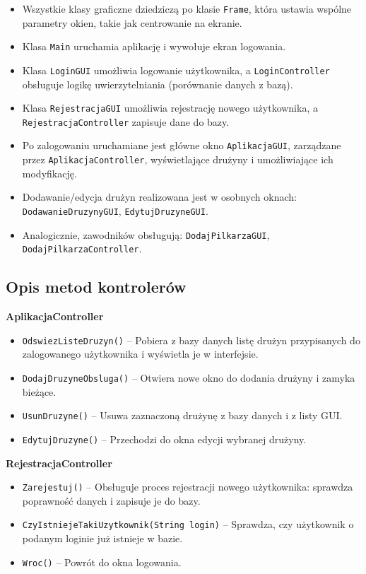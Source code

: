 \documentclass{urdpl}     %
\begin{document}
\begin{itemize}
  \item Wszystkie klasy graficzne dziedziczą po klasie \texttt{Frame}, która ustawia wspólne parametry okien, takie jak centrowanie na ekranie.
  \item Klasa \texttt{Main} uruchamia aplikację i wywołuje ekran logowania.
  \item Klasa \texttt{LoginGUI} umożliwia logowanie użytkownika, a \texttt{LoginController} obsługuje logikę uwierzytelniania (porównanie danych z bazą).
  \item Klasa \texttt{RejestracjaGUI} umożliwia rejestrację nowego użytkownika, a \texttt{RejestracjaController} zapisuje dane do bazy.
  \item Po zalogowaniu uruchamiane jest główne okno \texttt{AplikacjaGUI}, zarządzane przez \texttt{AplikacjaController}, wyświetlające drużyny i umożliwiające ich modyfikację.
  \item Dodawanie/edycja drużyn realizowana jest w osobnych oknach: \texttt{DodawanieDruzynyGUI}, \texttt{EdytujDruzyneGUI}.
  \item Analogicznie, zawodników obsługują: \texttt{DodajPilkarzaGUI}, \texttt{DodajPilkarzaController}.

\end{itemize}

\subsection{Opis metod kontrolerów}

\textbf{AplikacjaController}
\begin{itemize}
  \item \texttt{OdswiezListeDruzyn()} – Pobiera z bazy danych listę drużyn przypisanych do zalogowanego użytkownika i wyświetla je w interfejsie.
  \item \texttt{DodajDruzyneObsluga()} – Otwiera nowe okno do dodania drużyny i zamyka bieżące.
  \item \texttt{UsunDruzyne()} – Usuwa zaznaczoną drużynę z bazy danych i z listy GUI.
  \item \texttt{EdytujDruzyne()} – Przechodzi do okna edycji wybranej drużyny.
\end{itemize}

\textbf{RejestracjaController}
\begin{itemize}
  \item \texttt{Zarejestuj()} – Obsługuje proces rejestracji nowego użytkownika: sprawdza poprawność danych i zapisuje je do bazy.
  \item \texttt{CzyIstniejeTakiUzytkownik(String login)} – Sprawdza, czy użytkownik o podanym loginie już istnieje w bazie.
  \item \texttt{Wroc()} – Powrót do okna logowania.
\end{itemize}
\end{document}
